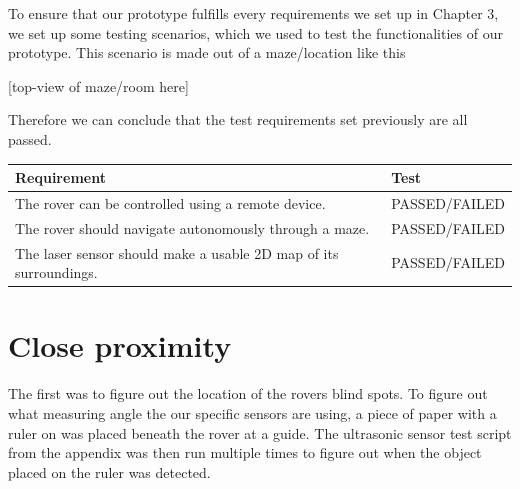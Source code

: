 To ensure that our prototype fulfills every requirements we set up in Chapter 3, we set up some testing scenarios, which we used to test the functionalities of our prototype. This scenario is made out of a maze/location like this

[top-view of maze/room here]



Therefore we can conclude that the test requirements set previously are all passed.

\begin{table}[H]
	\begin{tabular}{|l|l|}
		\hline
		\textbf{Requirement} & \textbf{Test} \\ \hline
		The rover can be controlled using a remote device. & PASSED/FAILED \\ \hline
		The rover should navigate autonomously through a maze. & PASSED/FAILED \\ \hline
		The laser sensor should make a usable 2D map of its surroundings. & PASSED/FAILED \\ \hline
	\end{tabular}
\end{table}

\clearpage
\section{Close proximity}

The first was to figure out the location of the rovers blind spots. To figure out what measuring angle the our specific sensors are using, a piece of paper with a ruler on was placed beneath the rover at a guide. The ultrasonic sensor test script from the appendix was then run multiple times to figure out when the object placed on the ruler was detected.

